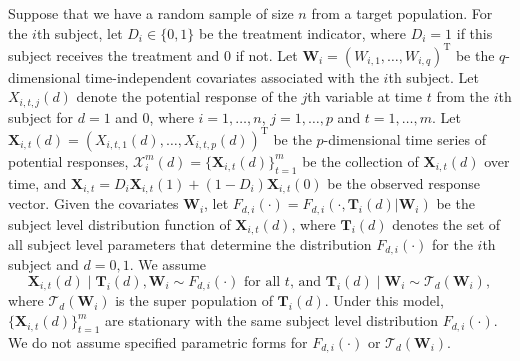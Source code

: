 \documentclass[12pt]{article}
\def\T{{ \mathrm{\scriptscriptstyle T} }}
\theoremstyle{definition}
\newcommand{\bT}{{\mathbf T}}
\newcommand{\bW}{{\mathbf W}}
\newcommand{\bX}{{\mathbf X}}
\begin{document}
Suppose that we have a random sample of size $n$ from a target population. For the $i$th subject, let $D_{i} \in \{0, 1\}$ be the treatment indicator, where $D_{i} = 1$ if this subject receives the treatment and $0$ if not. 
Let $\bW_{i} = (W_{i,1}, \ldots, W_{i,q})^{\T}$ be the $q$-dimensional time-independent covariates associated with the $i$th subject. 
Let $X_{i, t, j}(d)$ denote the potential response of the $j$th variable at time $t$ from the $i$th subject for $d = 1$ and $0$, 
where $i = 1, \ldots, n$, $j = 1, \ldots, p$ and $t = 1, \ldots, m$. 
Let $\bX_{i, t}(d) = (X_{i, t, 1}(d), \ldots, X_{i, t, p}(d))^{\T}$ be the $p$-dimensional time series of potential responses, $\mathcal{X}_i^m(d) = \{\bX_{i, t}(d)\}_{t=1}^{m}$ be the collection of $\bX_{i, t}(d)$ over time,  and $\bX_{i, t} = D_{i} \bX_{i, t}(1) + (1 - D_{i}) \bX_{i, t}(0)$ be the observed response vector.
Given the covariates $\bW_{i}$, let $F_{d, i}(\cdot) = F_{d, i}(\cdot, \bT_{i}(d) | \bW_{i})$ 
be the subject level distribution function of $\bX_{i, t}(d)$, 
where $\bT_{i}(d)$ denotes the set of all subject level parameters
that determine the distribution $F_{d, i}(\cdot)$ for the $i$th subject and $d = 0, 1$.
We assume 
$$\bX_{i, t}(d) \mid \bT_{i}(d), \bW_i \sim F_{d, i}(\cdot) \mbox{\ for all $t$, and \ } \bT_{i}(d) \mid \bW_i \sim \mathcal{T}_{d}(\bW_{i}),$$
where $\mathcal{T}_{d}(\bW_{i})$
is the super population of $\bT_{i}(d)$. 
Under this model, $\{\bX_{i, t}(d)\}_{t=1}^{m}$ are stationary with the same subject level distribution $F_{d, i}(\cdot)$.
We do not assume specified parametric forms for $F_{d, i}(\cdot)$ or $\mathcal{T}_{d}(\bW_{i})$.
\end{document}

